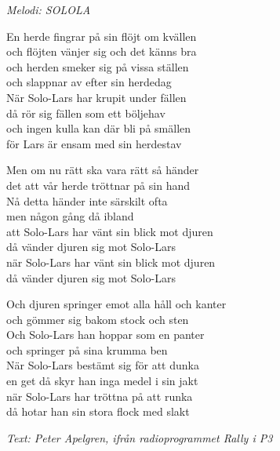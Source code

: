 {\footnotesize\textit{Melodi: SOLOLA}}\par
\vspace{10pt}
En herde fingrar på sin flöjt om kvällen\\
och flöjten vänjer sig och det känns bra\\
och herden smeker sig på vissa ställen\\
och slappnar av efter sin herdedag\\
När Solo-Lars har krupit under fällen\\
då rör sig fällen som ett böljehav\\
och ingen kulla kan där bli på smällen\\
för Lars är ensam med sin herdestav\par
\vspace{10pt}
Men om nu rätt ska vara rätt så händer\\
det att vår herde tröttnar på sin hand\\
Nå detta händer inte särskilt ofta\\
men någon gång då ibland \\
att Solo-Lars har vänt sin blick mot djuren\\
då vänder djuren sig mot Solo-Lars \\
när Solo-Lars har vänt sin blick mot djuren\\
då vänder djuren sig mot Solo-Lars\par
\vspace{10pt}
Och djuren springer emot alla håll och kanter\\
och gömmer sig bakom stock och sten\\
Och Solo-Lars han hoppar som en panter\\
och springer på sina krumma ben \\
När Solo-Lars bestämt sig för att dunka\\
en get då skyr han inga medel i sin jakt\\
när Solo-Lars har tröttna på att runka\\
då hotar han sin stora flock med slakt
\par
\vspace{10pt}
{\footnotesize\textit{Text: Peter Apelgren, ifrån radioprogrammet Rally i P3}}
